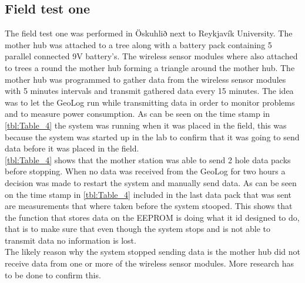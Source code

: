 \subsection{Field test one}
The field test one was performed in Öskuhlið next to Reykjavík University. The mother hub was attached to a tree along with a battery pack containing 5 parallel connected 9V battery's. The wireless sensor modules where also attached to trees a round the mother hub forming a triangle around the mother hub. The mother hub was programmed to gather data from the wireless sensor modules with 5 minutes intervals and transmit gathered data every 15 minutes. The idea was to let the GeoLog run while transmitting data in order to monitor problems and to measure power consumption. As can be seen on the time stamp  in \ref{tbl:Table_4} the system was running when it was placed in the field, this was because the system was started up in the lab to confirm that it was going to send data before it was placed in the field. \\
\ref{tbl:Table_4} shows that the mother station was able to send 2 hole data packs before stopping. When no data was received from the GeoLog for two hours a decision was made to restart the system and manually send data. As can be seen on the time stamp in \ref{tbl:Table_4} included in the last data pack that was sent are measurements that where taken before the system stooped. This shows that the function that stores data on the EEPROM is doing what it id designed to do, that is to make sure that even though the system stops and is not able to transmit data no information is lost. \\
The likely reason why the system stopped sending data is the mother hub did not receive data from one or more of the wireless sensor modules. More research has to be done to confirm this.
